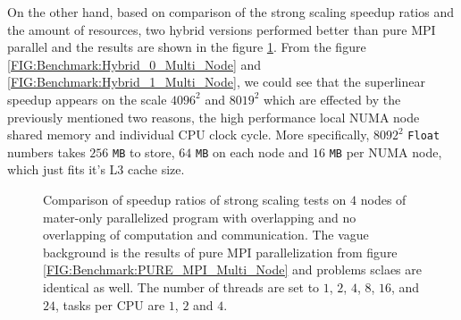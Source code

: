 On the other hand, 
based on comparison of the strong scaling speedup ratios and the amount of resources,
two hybrid versions performed better than pure MPI parallel and the 
results are shown in the figure \ref{FIG:Benchmark:Hybrid_Multi_Node}.
From the figure \ref{FIG:Benchmark:Hybrid_0_Multi_Node} and \ref{FIG:Benchmark:Hybrid_1_Multi_Node},
we could see that the superlinear speedup appears on the scale $4096^2$ and $8019^2$ which are effected by 
the previously mentioned two reasons, the high performance local NUMA node shared memory and individual CPU clock cycle.
More specifically, $8092^2$ \texttt{Float} numbers takes $256$ \texttt{MB} to store, $64$ \texttt{MB} on each node and $16$ \texttt{MB} per NUMA node,
which just fits it's L3 cache size.

\begin{figure}[htbp]
  \centering
  \hfill
  \caption{
    Comparison of speedup ratios of strong scaling tests on $4$ nodes of 
    mater-only parallelized program with overlapping and no overlapping of computation and communication.  
    The vague background is the results of pure MPI parallelization from figure 
    \ref{FIG:Benchmark:PURE_MPI_Multi_Node} and problems sclaes are identical as well.
    The number of threads are set to $1$, $2$, $4$, $8$, $16$, and $24$, 
    tasks per CPU are $1$, $2$ and $4$.
  }
  \label{FIG:Benchmark:Hybrid_Multi_Node}
\end{figure}

